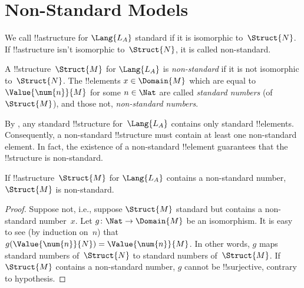 \documentclass[../../../include/open-logic-section]{subfiles}
\begin{document}
\section{Non-Standard Models}

\begin{explain}
We call !!a{structure} for $\Lang{L_A}$ standard if it is isomorphic
to~$\Struct{N}$. If !!a{structure} isn't isomorphic to~$\Struct{N}$,
it is called non-standard.
\end{explain}

\begin{defn}
A !!{structure}~$\Struct{M}$ for $\Lang{L_A}$ is \emph{non-standard}
if it is not isomorphic to~$\Struct{N}$. The !!{element}s $x \in
\Domain{M}$ which are equal to $\Value{\num{n}}{M}$ for some $n \in
\Nat$ are called \emph{standard numbers} (of $\Struct{M}$), and those
not, \emph{non-standard numbers}.
\end{defn}

\begin{explain}
By , any standard !!{structure}
for~$\Lang{L_A}$ contains only standard !!{element}s. Consequently, a
non-standard !!{structure} must contain at least one non-standard
element. In fact, the existence of a non-standard !!{element}
guarantees that the !!{structure} is non-standard.
\end{explain}

\begin{prop}
If !!a{structure}~$\Struct{M}$ for $\Lang{L_A}$ contains a
non-standard number, $\Struct{M}$ is non-standard.
\end{prop}

\begin{proof}
Suppose not, i.e., suppose $\Struct{M}$ standard but contains a
non-standard number~$x$. Let $g\colon \Nat \to \Domain{M}$ be an
isomorphism. It is easy to see (by induction on~$n$) that
$g(\Value{\num{n}}{N}) = \Value{\num{n}}{M}$. In other words, $g$ maps
standard numbers of~$\Struct{N}$ to standard numbers
of~$\Struct{M}$. If $\Struct{M}$ contains a non-standard number, $g$
cannot be !!{surjective}, contrary to hypothesis.
\end{proof}
\end{document}
